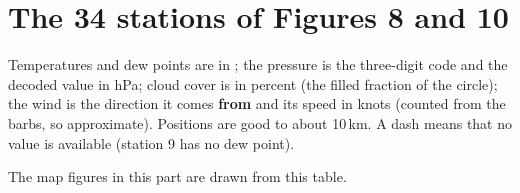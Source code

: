 \section{The 34 stations of Figures 8 and 10}\label{p3-app:stations}

Temperatures and dew points are in \degF; the pressure is the three-digit code and the decoded value in hPa; cloud cover is in percent (the filled fraction of the circle); the wind is the direction it comes \textbf{from} and its speed in knots (counted from the barbs, so approximate). Positions are good to about 10\,km. A dash means that no value is available (station 9 has no dew point).



The map figures in this part are drawn from this table.
